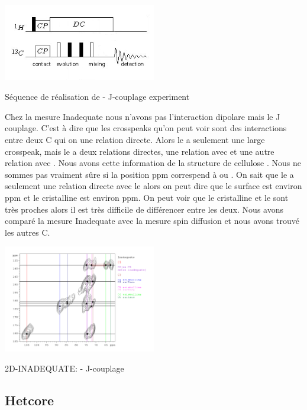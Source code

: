 \documentclass[a4paper,12pt]{scrartcl}
\begin{document}
{\begin{figurehere}
    \center
     \includegraphics[width=0.5\textwidth]{bilder/PDSD4.png}
     \caption{Séquence de réalisation de  -  J-couplage experiment}
    \end{figurehere}
Chez la mesure Inadequate nous n’avons pas l’interaction dipolare mais le J couplage. C’est à dire que les crosspeaks qu’on peut voir sont des interactions entre deux C qui on une relation directe. Alors le  a seulement une large crosspeak, mais le  a deux relations directes, une relation avec  et une autre relation avec . Nous avons cette information de la structure de cellulose \cite{dokument}. Nous ne sommes pas vraiment sûre si la position \unit [74,5] {ppm} correspend à  ou . On sait que le  a seulement une relation directe avec le  alors on peut dire que le  surface est environ \unit [72,1] {ppm} et le  cristalline est environ \unit [74,9] {ppm}. On peut voir que le  cristalline et le  sont très proches alors il est très difficile de différencer entre les deux. Nous avons comparé la mesure Inadequate avec la mesure spin diffusion et nous avons trouvé les autres C. 
\begin{figurehere}
    \center
    \includegraphics[width=0.5\textwidth]{bilder/inad.png}
    \caption{2D-INADEQUATE:  -  J-couplage }
   \end{figurehere}
  \subsection{Hetcore}
 
}
\end{document}

